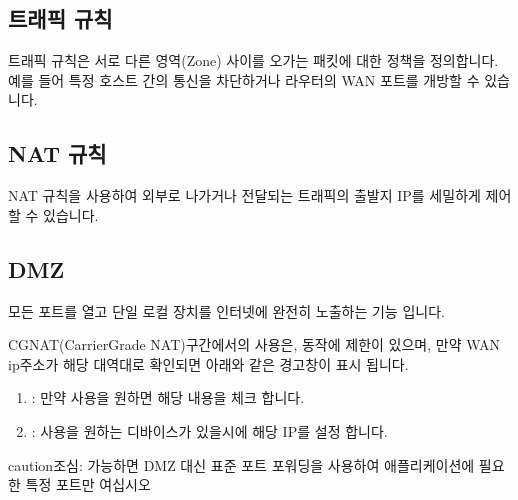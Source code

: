 \documentclass[letterpaper,10pt,english]{sphinxmanual}
\begin{document}
\subsection{트래픽 규칙}
\label{\detokenize{main_menu/network:id9}}
\noindent{}

\sphinxAtStartPar
트래픽 규칙은 서로 다른 영역(Zone) 사이를 오가는 패킷에 대한 정책을 정의합니다. 예를 들어 특정 호스트 간의 통신을 차단하거나 라우터의 WAN 포트를 개방할 수 있습니다.


\subsection{NAT 규칙}
\label{\detokenize{main_menu/network:nat}}
\noindent{}

\sphinxAtStartPar
NAT 규칙을 사용하여 외부로 나가거나 전달되는 트래픽의 출발지 IP를 세밀하게 제어할 수 있습니다.


\subsection{DMZ}
\label{\detokenize{main_menu/network:dmz}}
\noindent{}

\sphinxAtStartPar
모든 포트를 열고 단일 로컬 장치를 인터넷에 완전히 노출하는 기능 입니다.

\sphinxAtStartPar
CGNAT(Carrier\sphinxhyphen{}Grade NAT)구간에서의 사용은, 동작에 제한이 있으며, 만약 WAN ip주소가 해당 대역대로 확인되면 아래와 같은 경고창이 표시 됩니다.

\sphinxAtStartPar
{}
\begin{enumerate}
%
\item {} 
\sphinxAtStartPar
{} :  만약 사용을 원하면 해당 내용을 체크 합니다.

\item {} 
\sphinxAtStartPar
{} : 사용을 원하는 디바이스가 있을시에 해당 IP를 설정 합니다.

\end{enumerate}

\begin{sphinxadmonition}{caution}{조심:}
\sphinxAtStartPar
가능하면 DMZ 대신 표준 포트 포워딩을 사용하여 애플리케이션에 필요한 특정 포트만 여십시오
\end{sphinxadmonition}
\end{document}
